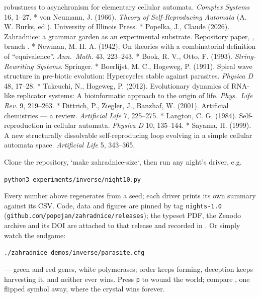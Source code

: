 robustness to asynchronism for elementary cellular automata.
{\it Complex Systems} 16, 1--27.
* von Neumann, J. (1966). {\it Theory of Self-Reproducing
Automata} (A. W. Burks, ed.). University of Illinois Press.
* Popelka, J., Claude (2026). Zahradnice: a grammar garden as an
experimental substrate. Repository paper,
, branch .
* Newman, M. H. A. (1942). On theories with a combinatorial
definition of “equivalence”. {\it Ann.\ Math.} 43, 223--243.
* Book, R. V., Otto, F. (1993). {\it String-Rewriting Systems}.
Springer.
* Boerlijst, M. C., Hogeweg, P. (1991). Spiral wave structure in
pre-biotic evolution: Hypercycles stable against parasites.
{\it Physica D} 48, 17--28.
* Takeuchi, N., Hogeweg, P. (2012). Evolutionary dynamics of
RNA-like replicator systems: A bioinformatic approach to the
origin of life. {\it Phys.\ Life Rev.} 9, 219--263.
* Dittrich, P., Ziegler, J., Banzhaf, W. (2001). Artificial
chemistries --- a review. {\it Artificial Life} 7, 225--275.
* Langton, C. G. (1984). Self-reproduction in cellular automata.
{\it Physica D} 10, 135--144.
* Sayama, H. (1999). A new structurally dissolvable
self-reproducing loop evolving in a simple cellular automata
space. {\it Artificial Life} 5, 343--365.
\enditems

\medskip
{} Clone the repository, `make
zahradnice-size`, then run any night's driver, e.g.
\medskip
\centerline{\tt python3 experiments/inverse/night10.py}
\medskip
\noindent Every number above regenerates from a seed; each driver
prints its own summary against its CSV. Code, data and figures are
pinned by tag {\tt nights-1.0}
({\tt github.com/popojan/zahradnice/releases}); the typeset PDF,
the Zenodo archive and its DOI are attached to that release and
recorded in . Or simply watch the
endgame:
\medskip
\centerline{\tt ./zahradnice demos/inverse/parasite.cfg}
\medskip
\noindent --- green and red genes, white polymerases; order keeps
forming, deception keeps harvesting it, and neither ever wins.
Press {\tt p} to wound the world; compare
, one flipped symbol away, where the
crystal wins forever.

\bye
